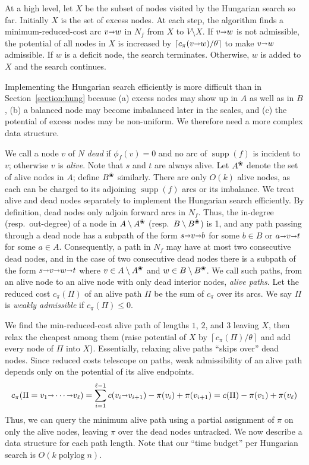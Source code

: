 \documentclass[11pt]{article}
\def\polylog{\mathop{\mathrm{polylog}}}
\def\Ceil#1{\left\lceil #1 \right\rceil}
\def\fsupply{\phi}
\def\arcto{\mathord\shortrightarrow}
\def\arc#1#2{#1\arcto#2}
\def\supp{\operatorname{supp}}
\def\alive#1{{#1}^\text{\ding{96}}}
\def\dead#1{{#1} \setminus \alive{#1}}
\numberwithin{figure}{section}
\def\EMPH#1{\textcolor{BrickRed}{{\emph{#1}}}}
\begin{document}
At a high level, let \EMPH{$X$} be the subset of nodes visited by the Hungarian search
so far.
Initially $X$ is the set of excess nodes.
At each step, the algorithm finds a minimum-reduced-cost arc $\arc vw$ in $N_f$
from $X$ to $V \setminus X$.
If $\arc vw$ is not admissible, the potential of all nodes in $X$ is increased
by $\Ceil{c_\pi(\arc vw)/\theta}$ to make $\arc vw$ admissible.
If $w $ is a deficit node, the search terminates.
Otherwise, $w$ is added to $X$ and the search continues.

Implementing the Hungarian search efficiently is more difficult than in
Section~\ref{section:hung} because (a) excess nodes may show up in $A$ as well as in $B$,
(b) a balanced node may become imbalanced later in the scales,
and (c) the potential of excess nodes may be non-uniform.
We therefore need a more complex data structure.

We call a node $v$ of $N$ \EMPH{dead} if $\fsupply_f(v) = 0$ and no arc of
$\supp(f)$ is incident to $v$; otherwise $v$ is \EMPH{alive}.
Note that $s$ and $t$ are always alive.
Let \EMPH{$\alive{A}$} denote the set of alive nodes in $A$; define \EMPH{$\alive{B}$} similarly.
There are only $O(k)$ alive nodes, as each can be charged to its
adjoining $\supp(f)$ arcs or its imbalance.
We treat alive and dead nodes separately to implement the Hungarian search
efficiently.
By definition, dead nodes only adjoin forward arcs in $N_f$.
Thus, the in-degree (resp.\ out-degree) of a node in $\dead{A}$ (resp.\ $\dead{B}$)
is 1, and any path passing through a dead node has a subpath of the form
$s \arcto v \arcto b$ for some $b \in B$ or $a \arcto v \arcto t$ for some $a \in A$.
Consequently, a path in $N_f$ may have at most two consecutive dead nodes,
and in the case of two consecutive dead nodes there is a subpath of the
form $s \arcto v \arcto w \arcto t$ where $v \in \dead{A}$ and $w \in \dead{B}$.
We call such paths, from an alive node to an alive node
with only dead interior nodes, \EMPH{alive paths}.
Let the reduced cost $c_\pi(\Pi)$ of an alive path $\Pi$ be the sum of $c_\pi$ over its arcs.
We say $\Pi$ is \EMPH{weakly admissible} if $c_\pi(\Pi) \leq 0$.

We find the min-reduced-cost alive path of lengths $1$, $2$, and $3$
leaving $X$, then relax the cheapest among them
(raise potential of $X$ by $\Ceil{c_\pi(\Pi)/\theta}$ and add every node of $\Pi$ into $X$).
Essentially, relaxing alive paths ``skips over'' dead nodes.
Since reduced costs telescope on paths, weak admissibility of an alive path
depends only on the potential of its alive endpoints.
\[
c_\pi(\Pi = v_1 \arcto \cdots \arcto v_\ell)
	= \sum_{i=1}^{\ell-1} c(\arc{v_i}{v_{i+1}}) - \pi(v_i) + \pi(v_{i+1})
	= c(\Pi) - \pi(v_1) + \pi(v_\ell)
\]
Thus, we can query the minimum alive path using a partial assignment
of $\pi$ on only the alive nodes, leaving $\pi$ over the dead nodes untracked.
We now describe a data structure for each path length.
Note that our ``time budget'' per Hungarian search is $O(k\polylog n)$.
\end{document}
